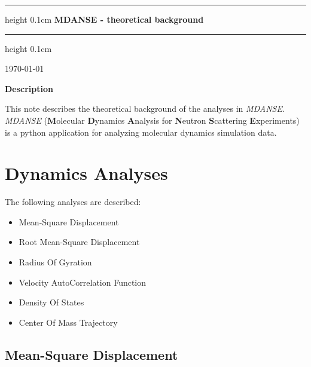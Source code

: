 \documentclass[a4paper,11pt]{article}
\begin{document}
\begin{titlepage}

\begin{center}

\vspace{2cm}

\hrule height 0.1cm
\vspace{0.5cm}
{\Huge \bfseries MDANSE - theoretical background}\\
\vspace{0.5cm}
\hrule height 0.1cm

\vspace{1.0cm}

{\large \today}\\

\vspace{1.0cm}

{\large \textbf{Description}}\\

\end{center}

\noindent This note describes the theoretical background of the analyses in \textit{MDANSE}. \textit{MDANSE} (\textbf{M}olecular \textbf{D}ynamics \textbf{A}nalysis
for \textbf{N}eutron \textbf{S}cattering \textbf{E}xperiments) is a python application for analyzing molecular dynamics simulation data.


\end{titlepage}

\tableofcontents{}

\newpage

\section{Dynamics Analyses}
\label{dynamics_menu}
The following analyses are described:
\begin{itemize}
\item Mean-Square Displacement
\item Root Mean-Square Displacement
\item Radius Of Gyration
\item Velocity AutoCorrelation Function
\item Density Of States
\item Center Of Mass Trajectory
\end{itemize}

\subsection{Mean-Square Displacement}
\label{msd}
\end{document}
